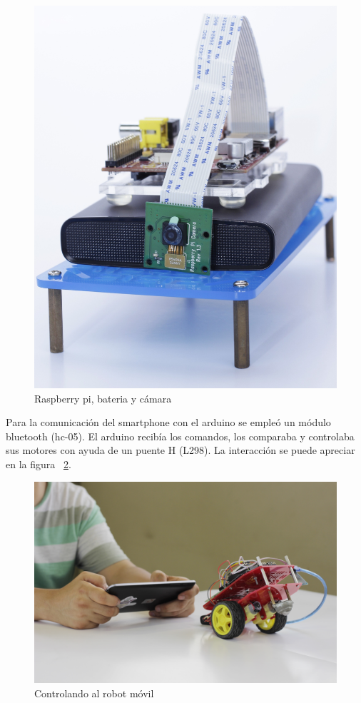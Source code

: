 \begin{figure}[h!]
  \centering
  \includegraphics[scale=0.1]{images/activities/robot_movil/raspberry-pi.jpg}
  \caption{Raspberry pi, bateria y cámara}
  \label{fig:raspberry-pi}
\end{figure}

Para la comunicación del smartphone con el arduino se empleó un módulo bluetooth (hc-05). El arduino recibía los comandos, los comparaba y controlaba sus motores con ayuda de un puente H (L298). La interacción se puede apreciar en la figura ~\ref{fig:robot1}.

\begin{figure}[h!]
  \centering
  \includegraphics[scale=0.1]{images/activities/robot_movil/robot1.jpg}
  \caption{Controlando al robot móvil}
  \label{fig:robot1}
\end{figure}

